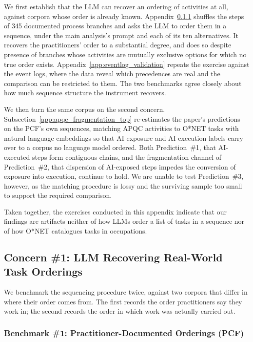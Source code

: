 We first establish that the LLM can recover an ordering of activities at all, against corpora whose order is
already known.
Appendix~\ref{app:apqc_validation} shuffles the steps of 345 documented process branches and asks the LLM to
order them in a sequence, under the main analysis's prompt and each of its ten alternatives.
It recovers the practitioners' order to a substantial degree, and does so despite presence of branches whose activities 
are mutually exclusive options for which no true order exists.
Appendix~\ref{app:eventlog_validation} repeats the exercise against the event logs, where the data reveal
which precedences are real and the comparison can be restricted to them.
The two benchmarks agree closely about how much sequence structure the instrument recovers.

We then turn the same corpus on the second concern.
Subsection~\ref{app:apqc_fragmentation_top} re-estimates the paper's predictions on the PCF's own sequences,
matching APQC activities to O*NET tasks with natural-language embeddings so that AI exposure and AI execution labels carry over to a corpus no language model ordered.
Both Prediction~\#1, that AI-executed steps form contiguous chains, and the fragmentation channel of
Prediction~\#2, that dispersion of AI-exposed steps impedes the conversion of exposure into execution,
continue to hold.
We are unable to test Prediction~\#3, however, as the matching procedure is lossy and the surviving sample too small to support
the required comparison.

Taken together, the exercises conducted in this appendix indicate that our findings are artifacts neither of how LLMs
order a list of tasks in a sequence nor of how O*NET catalogues tasks in occupations.

\subsection{Concern \#1: LLM Recovering Real-World Task Orderings}
\label{app:sequencing_validation}

We benchmark the sequencing procedure twice, against two corpora that differ in where their order comes from.
The first records the order practitioners say they work in; the second records the order in which work was
actually carried out.

\subsubsection{Benchmark \#1: Practitioner-Documented Orderings (PCF)}
\label{app:apqc_validation}

